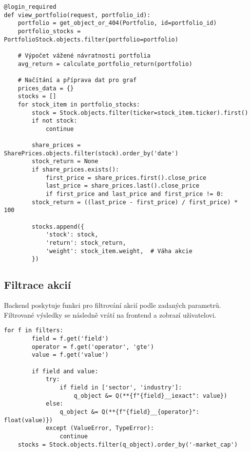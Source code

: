 \documentclass[12pt, a4paper]{report}
\begin{document}
\begin{lstlisting}[style=Python, caption= Kód pro správu portfolií]
@login_required
def view_portfolio(request, portfolio_id):
    portfolio = get_object_or_404(Portfolio, id=portfolio_id)
    portfolio_stocks = PortfolioStock.objects.filter(portfolio=portfolio)

    # Výpočet vážené návratnosti portfolia
    avg_return = calculate_portfolio_return(portfolio)

    # Načítání a příprava dat pro graf
    prices_data = {}
    stocks = []
    for stock_item in portfolio_stocks:
        stock = Stock.objects.filter(ticker=stock_item.ticker).first()
        if not stock:
            continue

        share_prices = SharePrices.objects.filter(stock).order_by('date')
        stock_return = None
        if share_prices.exists():
            first_price = share_prices.first().close_price
            last_price = share_prices.last().close_price
            if first_price and last_price and first_price != 0:
        stock_return = ((last_price - first_price) / first_price) * 100

        stocks.append({
            'stock': stock,
            'return': stock_return,
            'weight': stock_item.weight,  # Váha akcie
        })
\end{lstlisting}

\subsection{Filtrace akcií}

Backend poskytuje funkci pro filtrování akcií podle zadaných parametrů. Filtrované výsledky se následně vrátí na frontend a zobrazí uživatelovi.

\begin{lstlisting}[style=Python, caption= Kód pro filtr akcií]
    for f in filters:
        field = f.get('field')
        operator = f.get('operator', 'gte')
        value = f.get('value')

        if field and value:
            try:
                if field in ['sector', 'industry']:
                    q_object &= Q(**{f"{field}__iexact": value})
            else:
                q_object &= Q(**{f"{field}__{operator}": float(value)})
            except (ValueError, TypeError):
                continue
    stocks = Stock.objects.filter(q_object).order_by('-market_cap')
\end{lstlisting}
\end{document}
